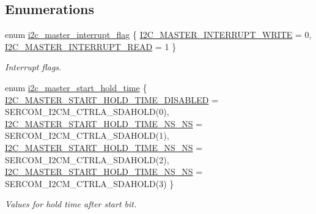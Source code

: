 \subsection*{Enumerations}
\begin{DoxyCompactItemize}
\item 
enum \mbox{\hyperlink{group__asfdoc__sam0__sercom__i2c__group_ga9f73c4fbd225704c2e0da23319c25555}{i2c\+\_\+master\+\_\+interrupt\+\_\+flag}} \{ \mbox{\hyperlink{group__asfdoc__sam0__sercom__i2c__group_gga9f73c4fbd225704c2e0da23319c25555a39c138d5f063f3d43b4e974870364d2e}{I2\+C\+\_\+\+M\+A\+S\+T\+E\+R\+\_\+\+I\+N\+T\+E\+R\+R\+U\+P\+T\+\_\+\+W\+R\+I\+TE}} = 0, 
\mbox{\hyperlink{group__asfdoc__sam0__sercom__i2c__group_gga9f73c4fbd225704c2e0da23319c25555a3087032aa3a5218a0cdc54179d9e1d09}{I2\+C\+\_\+\+M\+A\+S\+T\+E\+R\+\_\+\+I\+N\+T\+E\+R\+R\+U\+P\+T\+\_\+\+R\+E\+AD}} = 1
 \}
\begin{DoxyCompactList}\small\item\em Interrupt flags. \end{DoxyCompactList}\item 
enum \mbox{\hyperlink{group__asfdoc__sam0__sercom__i2c__group_gadd8aa7cabbddc1cd2c1a8753c9b99d20}{i2c\+\_\+master\+\_\+start\+\_\+hold\+\_\+time}} \{ \mbox{\hyperlink{group__asfdoc__sam0__sercom__i2c__group_ggadd8aa7cabbddc1cd2c1a8753c9b99d20a85f0b592eef5f8b5ecae9f2cca2d4cd1}{I2\+C\+\_\+\+M\+A\+S\+T\+E\+R\+\_\+\+S\+T\+A\+R\+T\+\_\+\+H\+O\+L\+D\+\_\+\+T\+I\+M\+E\+\_\+\+D\+I\+S\+A\+B\+L\+ED}} = S\+E\+R\+C\+O\+M\+\_\+\+I2\+C\+M\+\_\+\+C\+T\+R\+L\+A\+\_\+\+S\+D\+A\+H\+O\+LD(0), 
\mbox{\hyperlink{group__asfdoc__sam0__sercom__i2c__group_ggadd8aa7cabbddc1cd2c1a8753c9b99d20a41403c4a18a1220f031c99e52f384e39}{I2\+C\+\_\+\+M\+A\+S\+T\+E\+R\+\_\+\+S\+T\+A\+R\+T\+\_\+\+H\+O\+L\+D\+\_\+\+T\+I\+M\+E\+\_\+N\+S\+\_\+NS}} = S\+E\+R\+C\+O\+M\+\_\+\+I2\+C\+M\+\_\+\+C\+T\+R\+L\+A\+\_\+\+S\+D\+A\+H\+O\+LD(1), 
\mbox{\hyperlink{group__asfdoc__sam0__sercom__i2c__group_ggadd8aa7cabbddc1cd2c1a8753c9b99d20acc3f7849862510590acc2e3bebc29d0c}{I2\+C\+\_\+\+M\+A\+S\+T\+E\+R\+\_\+\+S\+T\+A\+R\+T\+\_\+\+H\+O\+L\+D\+\_\+\+T\+I\+M\+E\+\_\+N\+S\+\_\+NS}} = S\+E\+R\+C\+O\+M\+\_\+\+I2\+C\+M\+\_\+\+C\+T\+R\+L\+A\+\_\+\+S\+D\+A\+H\+O\+LD(2), 
\mbox{\hyperlink{group__asfdoc__sam0__sercom__i2c__group_ggadd8aa7cabbddc1cd2c1a8753c9b99d20a38cf380ace8d180528eb34bc38b7da9e}{I2\+C\+\_\+\+M\+A\+S\+T\+E\+R\+\_\+\+S\+T\+A\+R\+T\+\_\+\+H\+O\+L\+D\+\_\+\+T\+I\+M\+E\+\_\+N\+S\+\_\+NS}} = S\+E\+R\+C\+O\+M\+\_\+\+I2\+C\+M\+\_\+\+C\+T\+R\+L\+A\+\_\+\+S\+D\+A\+H\+O\+LD(3)
 \}
\begin{DoxyCompactList}\small\item\em Values for hold time after start bit. \end{DoxyCompactList}\item 

\end{DoxyCompactItemize}
